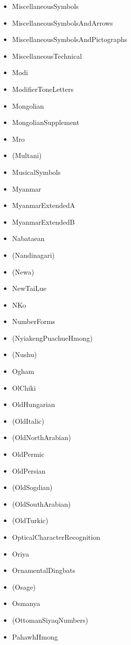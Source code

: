 \documentclass{article}
\newenvironment{itemlist}{%
  \begin{itemize}
  \setlength{\itemsep}{0pt}
  \setlength{\parsep}{0pt}
  \setlength{\topsep}{0pt}
  \setlength{\partopsep}{0pt}
  \setlength{\parskip}{0pt}
  \setlength{\labelsep}{5pt}}%
{
  \end{itemize}}
\begin{document}
\begin{multicols*}{2}
\begin{itemlist}
        \item MiscellaneousSymbols
        \item MiscellaneousSymbolsAndArrows
        \item MiscellaneousSymbolsAndPictographs
        \item MiscellaneousTechnical
        \item Modi
        \item ModifierToneLetters
        \item Mongolian
        \item MongolianSupplement
        \item Mro
        \item (Multani)
        \item MusicalSymbols
        \item Myanmar
        \item MyanmarExtendedA
        \item MyanmarExtendedB
        \item Nabataean
        \item (Nandinagari)
        \item (Newa)
        \item NewTaiLue
        \item NKo
        \item NumberForms
        \item (NyiakengPuachueHmong)
        \item (Nushu)
        \item Ogham
        \item OlChiki
        \item OldHungarian
        \item (OldItalic)
        \item (OldNorthArabian)
        \item OldPermic
        \item OldPersian
        \item (OldSogdian)
        \item (OldSouthArabian)
        \item (OldTurkic)
        \item OpticalCharacterRecognition
        \item Oriya
        \item OrnamentalDingbats
        \item (Osage)
        \item Osmanya
        \item (OttomanSiyaqNumbers)
        \item PahawhHmong

\end{itemlist}
\end{multicols*}
\end{document}
